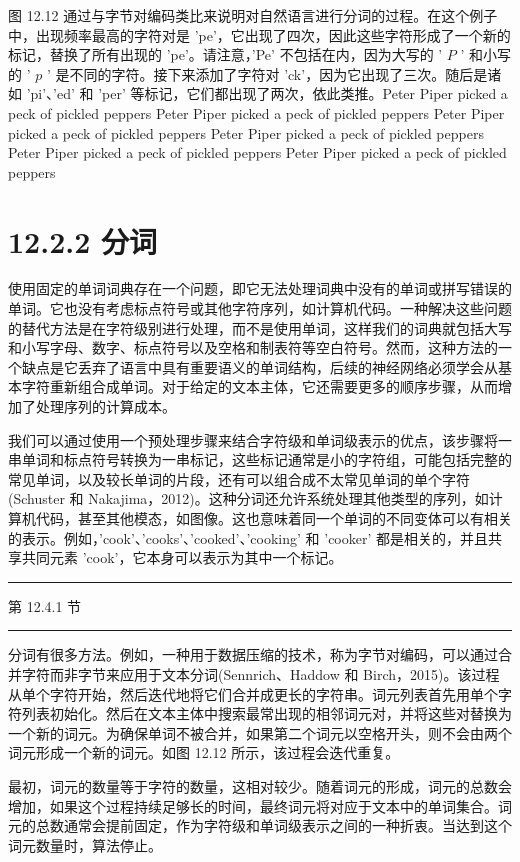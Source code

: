 \documentclass[10pt]{article}
\newcommand{\HRule}{\begin{center}\rule{0.9\linewidth}{0.2mm}\end{center}}
\begin{document}
图 12.12 通过与字节对编码类比来说明对自然语言进行分词的过程。在这个例子中，出现频率最高的字符对是 'pe'，它出现了四次，因此这些字符形成了一个新的标记，替换了所有出现的 'pe'。请注意，'Pe' 不包括在内，因为大写的 ’ \(P\) ’ 和小写的 ’ \(p\) ’ 是不同的字符。接下来添加了字符对 ’ck’，因为它出现了三次。随后是诸如 'pi'、'ed' 和 'per' 等标记，它们都出现了两次，依此类推。Peter Piper picked a peck of pickled peppers Peter Piper picked a peck of pickled peppers Peter Piper picked a peck of pickled peppers Peter Piper picked a peck of pickled peppers Peter Piper picked a peck of pickled peppers Peter Piper picked a peck of pickled peppers

\section*{12.2.2 分词}

使用固定的单词词典存在一个问题，即它无法处理词典中没有的单词或拼写错误的单词。它也没有考虑标点符号或其他字符序列，如计算机代码。一种解决这些问题的替代方法是在字符级别进行处理，而不是使用单词，这样我们的词典就包括大写和小写字母、数字、标点符号以及空格和制表符等空白符号。然而，这种方法的一个缺点是它丢弃了语言中具有重要语义的单词结构，后续的神经网络必须学会从基本字符重新组合成单词。对于给定的文本主体，它还需要更多的顺序步骤，从而增加了处理序列的计算成本。

我们可以通过使用一个预处理步骤来结合字符级和单词级表示的优点，该步骤将一串单词和标点符号转换为一串标记，这些标记通常是小的字符组，可能包括完整的常见单词，以及较长单词的片段，还有可以组合成不太常见单词的单个字符(Schuster 和 Nakajima，2012)。这种分词还允许系统处理其他类型的序列，如计算机代码，甚至其他模态，如图像。这也意味着同一个单词的不同变体可以有相关的表示。例如，'cook'、'cooks'、'cooked'、'cooking' 和 'cooker' 都是相关的，并且共享共同元素 'cook'，它本身可以表示为其中一个标记。

\HRule

第 12.4.1 节

\HRule

分词有很多方法。例如，一种用于数据压缩的技术，称为字节对编码，可以通过合并字符而非字节来应用于文本分词(Sennrich、Haddow 和 Birch，2015)。该过程从单个字符开始，然后迭代地将它们合并成更长的字符串。词元列表首先用单个字符列表初始化。然后在文本主体中搜索最常出现的相邻词元对，并将这些对替换为一个新的词元。为确保单词不被合并，如果第二个词元以空格开头，则不会由两个词元形成一个新的词元。如图 12.12 所示，该过程会迭代重复。

最初，词元的数量等于字符的数量，这相对较少。随着词元的形成，词元的总数会增加，如果这个过程持续足够长的时间，最终词元将对应于文本中的单词集合。词元的总数通常会提前固定，作为字符级和单词级表示之间的一种折衷。当达到这个词元数量时，算法停止。
\end{document}
